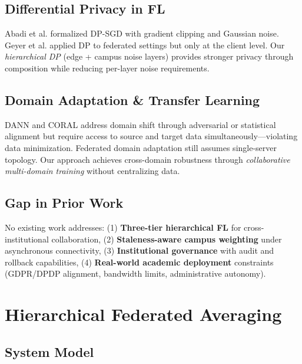 \documentclass[conference]{IEEEtran}
\begin{document}
\subsection{Differential Privacy in FL}

Abadi et al. \cite{abadi2016deep} formalized DP-SGD with gradient clipping and Gaussian noise. Geyer et al. \cite{geyer2017differentially} applied DP to federated settings but only at the client level. Our \textit{hierarchical DP} (edge + campus noise layers) provides stronger privacy through composition while reducing per-layer noise requirements.

\subsection{Domain Adaptation \& Transfer Learning}

DANN \cite{ganin2016domain} and CORAL \cite{sun2016coral} address domain shift through adversarial or statistical alignment but require access to source and target data simultaneously—violating data minimization. Federated domain adaptation \cite{peng2019federated} still assumes single-server topology. Our approach achieves cross-domain robustness through \textit{collaborative multi-domain training} without centralizing data.

\subsection{Gap in Prior Work}

No existing work addresses: (1) \textbf{Three-tier hierarchical FL} for cross-institutional collaboration, (2) \textbf{Staleness-aware campus weighting} under asynchronous connectivity, (3) \textbf{Institutional governance} with audit and rollback capabilities, (4) \textbf{Real-world academic deployment} constraints (GDPR/DPDP alignment, bandwidth limits, administrative autonomy).

\section{Hierarchical Federated Averaging}

\subsection{System Model}
\end{document}
